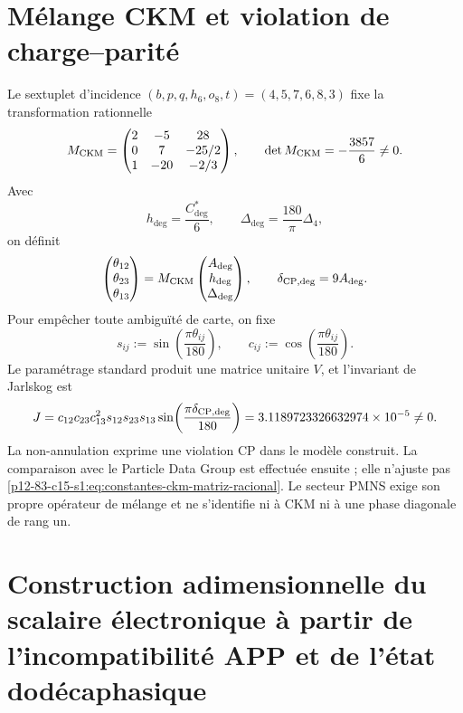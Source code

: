 \label{chap:83-15}

\section*{Mélange CKM et violation de charge--parité}

Le sextuplet d'incidence
\((b,p,q,h_6,o_8,t)=(4,5,7,6,8,3)\) fixe la transformation rationnelle
\begin{equation}\label{p12-83-c15-s1:eq:constantes-ckm-matriz-racional}
 M_{\rm CKM}=
 \begin{pmatrix}
 2&-5&28\\
 0&7&-25/2\\
 1&-20&-2/3
 \end{pmatrix},
 \qquad
 \det M_{\rm CKM}=-\frac{3857}{6}\ne0.
\end{equation}
Avec
\[
 h_{\deg}=\frac{C^*_{\deg}}6,\qquad
 \Delta_{\deg}=\frac{180}{\pi}\Delta_4,
\]
on définit
\[
 \begin{pmatrix}\theta_{12}\\\theta_{23}\\\theta_{13}\end{pmatrix}
 =M_{\rm CKM}
 \begin{pmatrix}A_{\deg}\\h_{\deg}\\\Delta_{\deg}\end{pmatrix},
 \qquad \delta_{{\rm CP},\deg}=9A_{\deg}.
\]
Pour empêcher toute ambiguïté de carte, on fixe
\[
 s_{ij}:=\sin\!\left(\frac{\pi\theta_{ij}}{180}\right),\qquad
 c_{ij}:=\cos\!\left(\frac{\pi\theta_{ij}}{180}\right).
\]
Le paramétrage standard produit une matrice unitaire \(V\), et
l'invariant de Jarlskog est
\begin{equation}\label{p12-83-c15-s1:eq:constantes-jarlskog}
 J=c_{12}c_{23}c_{13}^2s_{12}s_{23}s_{13}
 \sin\!\left(\frac{\pi\delta_{{\rm CP},\deg}}{180}\right)
 =3.1189723326632974\times10^{-5}\ne0.
\end{equation}
La non-annulation exprime une violation CP dans le modèle construit. La comparaison
avec le Particle Data Group est effectuée ensuite ; elle n'ajuste pas
\eqref{p12-83-c15-s1:eq:constantes-ckm-matriz-racional}. Le secteur PMNS exige son propre
opérateur de mélange et ne s'identifie ni à CKM ni à une phase diagonale de
rang un.


\section{Construction adimensionnelle du scalaire électronique à partir de l'incompatibilité APP et de l'état dodécaphasique}
\label{p12-83-c15-s2:chap:biografia-electron-rev6}

